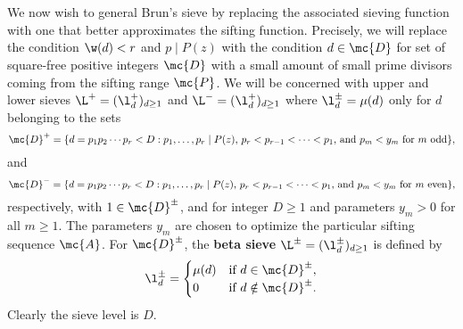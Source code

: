   \section{}
    We now wish to general Brun's sieve by replacing the associated sieving function with one that better approximates the sifting function. Precisely, we will replace the condition $\w(d) < r$ and $p \mid P(z)$ with the condition $d \in \mc{D}$ for set of square-free positive integers $\mc{D}$ with a small amount of small prime divisors coming from the sifting range $\mc{P}$. We will be concerned with upper and lower sieves $\L^{+} = (\l_{d}^{+})_{d \ge 1}$ and $\L^{-} = (\l_{d}^{+})_{d \ge 1}$ where $\l_{d}^{\pm} = \mu(d)$ only for $d$ belonging to the sets
    \[
      \mc{D}^{+} = \{d = p_{1}p_{2} \cdots p_{r} < D:\text{$p_{1},\ldots,p_{r} \mid P(z)$, $p_{r} < p_{r-1} < \cdots < p_{1}$, and $p_{m} < y_{m}$ for $m$ odd}\},
    \]
    and
    \[
      \mc{D}^{-} = \{d = p_{1}p_{2} \cdots p_{r} < D:\text{$p_{1},\ldots,p_{r} \mid P(z)$, $p_{r} < p_{r-1} < \cdots < p_{1}$, and $p_{m} < y_{m}$ for $m$ even}\},
    \]
    respectively, with $1 \in \mc{D}^{\pm}$, and for integer $D \ge 1$ and parameters $y_{m} > 0$ for all $m \ge 1$. The parameters $y_{m}$ are chosen to optimize the particular sifting sequence $\mc{A}$. For $\mc{D}^{\pm}$, the \textbf{beta sieve} $\L^{\pm} = (\l_{d}^{\pm})_{d \ge 1}$ is defined by
    \[
      \l_{d}^{\pm} = \begin{cases} \mu(d) & \text{if $d \in \mc{D}^{\pm}$}, \\ 0 & \text{if $d \notin \mc{D}^{\pm}$}. \end{cases}
    \]
    Clearly the sieve level is $D$. 
    
    \iffalse For a fixed $z$, index the sifting primes diving $P(z)$ as $q_{1} > q_{2} > \cdots > q_{m}$. Then we define the parameters $y_{m}$ by
    \[
      y_{m} = \left(\frac{D}{q_{1}q_{2} \cdots q_{m}}\right)^{\frac{1}{\b}},
    \]
    for some $\b \ge 1$. Thus if $d = p_{1}p_{2} \cdots p_{r} \in \mc{D}^{\pm}$ we have that $r \le m$. Moreover, $q_{1}\cdots q_{m}p_{m}^{\b} < D$ for $m$ odd or $m$ even depending on if $d \in \mc{D}^{+}$ or $d \in \mc{D}^{-}$ respectively.
    \fi
  \section{}
  \section{}
